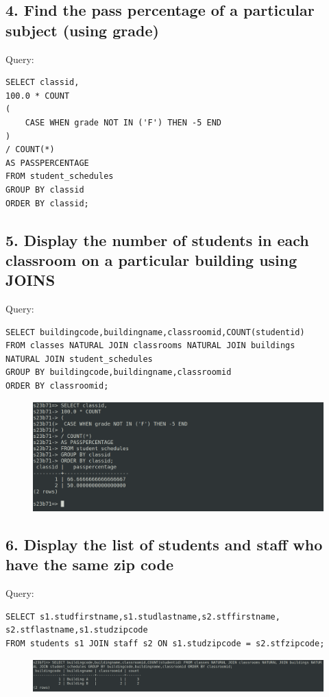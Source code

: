 \documentclass{article}
\begin{document}
\subsection*{4. Find the pass percentage of a particular subject (using grade)}
Query:
\begin{Verbatim}[frame=single,framerule=1pt,fontfamily=courier,fontsize=\small]
SELECT classid,
100.0 * COUNT
(
    CASE WHEN grade NOT IN ('F') THEN -5 END
) 
/ COUNT(*)
AS PASSPERCENTAGE
FROM student_schedules
GROUP BY classid
ORDER BY classid;
\end{Verbatim}

\subsection*{5. Display the number of students in each classroom on a particular building using JOINS}
Query:
\begin{Verbatim}[frame=single,framerule=1pt,fontfamily=courier,fontsize=\small]
SELECT buildingcode,buildingname,classroomid,COUNT(studentid) 
FROM classes NATURAL JOIN classrooms NATURAL JOIN buildings 
NATURAL JOIN student_schedules 
GROUP BY buildingcode,buildingname,classroomid 
ORDER BY classroomid;
\end{Verbatim}
\begin{figure}[H]
    \centering
    \includegraphics[width=\textwidth]{cycle4/4.5.png}
\end{figure}

\subsection*{6. Display the list of students and staff who have the same zip code}
Query:
\begin{Verbatim}[frame=single,framerule=1pt,fontfamily=courier,fontsize=\small]
SELECT s1.studfirstname,s1.studlastname,s2.stffirstname,
s2.stflastname,s1.studzipcode 
FROM students s1 JOIN staff s2 ON s1.studzipcode = s2.stfzipcode;
\end{Verbatim}
\begin{figure}[H]
    \centering
    \includegraphics[width=\textwidth]{cycle4/4.6.png}
\end{figure}
\end{document}
